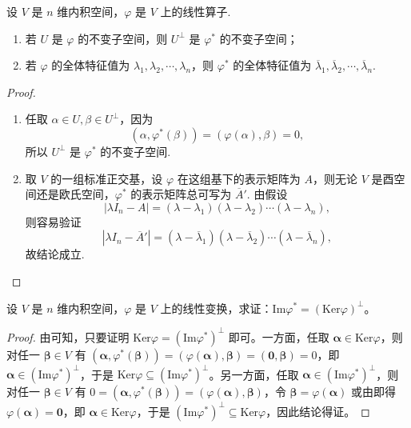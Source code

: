 \documentclass[../../main.tex]{subfiles}
\begin{document}
\begin{proposition}\label{proposition:线性算子的正交补空间就是伴随算子的不变子空间}
设 $V$ 是 $n$ 维内积空间，$\varphi$ 是 $V$ 上的线性算子.
\begin{enumerate}[(1)]
\item 若 $U$ 是 $\varphi$ 的不变子空间，则 $U^{\perp}$ 是 $\varphi^*$ 的不变子空间；

\item 若 $\varphi$ 的全体特征值为 $\lambda_1,\lambda_2,\cdots,\lambda_n$，则 $\varphi^*$ 的全体特征值为 $\overline{\lambda}_1,\overline{\lambda}_2,\cdots,\overline{\lambda}_n$.
\end{enumerate}
\end{proposition}
\begin{proof}
\begin{enumerate}[(1)]
\item 任取 $\alpha \in U, \beta \in U^{\perp}$，因为
\[
(\alpha,\varphi^*(\beta)) = (\varphi(\alpha),\beta) = 0,
\]
所以 $U^{\perp}$ 是 $\varphi^*$ 的不变子空间.

\item 取 $V$ 的一组标准正交基，设 $\varphi$ 在这组基下的表示矩阵为 $A$，则无论 $V$ 是酉空间还是欧氏空间，$\varphi^*$ 的表示矩阵总可写为 $\overline{A}'$. 由假设
\[
|\lambda I_n - A| = (\lambda - \lambda_1)(\lambda - \lambda_2)\cdots(\lambda - \lambda_n),
\]
则容易验证
\[
|\lambda I_n - \overline{A}'| = (\lambda - \overline{\lambda}_1)(\lambda - \overline{\lambda}_2)\cdots(\lambda - \overline{\lambda}_n),
\]
故结论成立.
\end{enumerate}

\end{proof}

\begin{proposition}\label{proposition:例9.27}
设 $V$ 是 $n$ 维内积空间，$\varphi$ 是 $V$ 上的线性变换，求证：$\mathrm{Im}\varphi^* = (\mathrm{Ker}\varphi)^\perp$。
\end{proposition}
\begin{proof}
由可知，只要证明 $\mathrm{Ker}\varphi = (\mathrm{Im}\varphi^*)^\perp$ 即可。一方面，任取 $\boldsymbol{\alpha} \in \mathrm{Ker}\varphi$，则对任一 $\boldsymbol{\beta} \in V$ 有 $(\boldsymbol{\alpha}, \varphi^*(\boldsymbol{\beta})) = (\varphi(\boldsymbol{\alpha}), \boldsymbol{\beta}) = (\boldsymbol{0}, \boldsymbol{\beta}) = 0$，即 $\boldsymbol{\alpha} \in (\mathrm{Im}\varphi^*)^\perp$，于是 $\mathrm{Ker}\varphi \subseteq (\mathrm{Im}\varphi^*)^\perp$。另一方面，任取 $\boldsymbol{\alpha} \in (\mathrm{Im}\varphi^*)^\perp$，则对任一 $\boldsymbol{\beta} \in V$ 有 $0 = (\boldsymbol{\alpha}, \varphi^*(\boldsymbol{\beta})) = (\varphi(\boldsymbol{\alpha}), \boldsymbol{\beta})$，令 $\boldsymbol{\beta} = \varphi(\boldsymbol{\alpha})$ 或由即得 $\varphi(\boldsymbol{\alpha}) = \boldsymbol{0}$，即 $\boldsymbol{\alpha} \in \mathrm{Ker}\varphi$，于是 $(\mathrm{Im}\varphi^*)^\perp \subseteq \mathrm{Ker}\varphi$，因此结论得证。

\end{proof}
\end{document}
